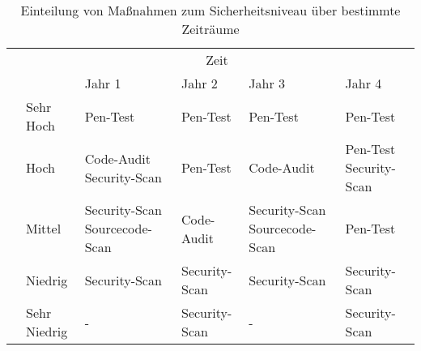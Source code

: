 \begin{table}[h]
	\begin{tabularx}{\textwidth}{l l || p{2.8cm}|p{2.8cm}|p{2.8cm}|p{2.8cm}}
	& \multicolumn{5}{c}{Zeit} \tabularnewline
	 & & Jahr 1 & Jahr 2 & Jahr 3 & Jahr 4 \tabularnewline \cline{2-6}\cline{2-6}
	\multirow{5}{*}{\rotatebox[origin=c]{90}{gef. Sicherheitsniveau}} & Sehr Hoch  & Pen-Test & Pen-Test & Pen-Test & Pen-Test \tabularnewline \cline{2-6}
	& Hoch  & Code-Audit \newline Security-Scan & Pen-Test & Code-Audit & Pen-Test \newline Security-Scan \tabularnewline \cline{2-6}
	& Mittel  & Security-Scan \newline Sourcecode-Scan & Code-Audit & Security-Scan \newline Sourcecode-Scan  & Pen-Test \tabularnewline \cline{2-6}
	& Niedrig  & Security-Scan & Security-Scan & Security-Scan & Security-Scan \tabularnewline \cline{2-6}
	& Sehr Niedrig  & - & Security-Scan & - & Security-Scan \tabularnewline
	\end{tabularx}
		\caption{Einteilung von Maßnahmen zum Sicherheitsniveau über bestimmte Zeiträume} 
	\label{tab:PenKontinuitaet}
\end{table}
